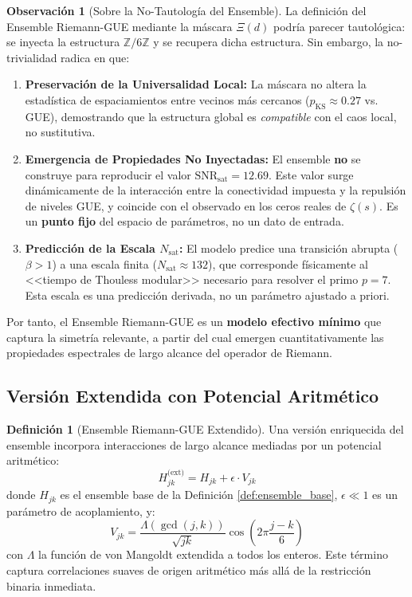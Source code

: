 \documentclass[12pt, a4paper]{article}
\theoremstyle{plain}
\theoremstyle{definition}
\newtheorem{definicion}[teorema]{Definición}
\newtheorem{observacion}[teorema]{Observación}
\theoremstyle{remark}
\begin{document}
\begin{observacion}[Sobre la No-Tautología del Ensemble]
La definición del Ensemble Riemann-GUE mediante la máscara $\Xi(d)$ podría parecer tautológica: se inyecta la estructura $\mathbb{Z}/6\mathbb{Z}$ y se recupera dicha estructura. Sin embargo, la no-trivialidad radica en que:
\begin{enumerate}
    \item \textbf{Preservación de la Universalidad Local:} La máscara no altera la estadística de espaciamientos entre vecinos más cercanos ($p_{\text{KS}} \approx 0.27$ vs. GUE), demostrando que la estructura global es \textit{compatible} con el caos local, no sustitutiva.
    \item \textbf{Emergencia de Propiedades No Inyectadas:} El ensemble \textbf{no} se construye para reproducir el valor $\mathrm{SNR}_{\text{sat}} = 12.69$. Este valor surge dinámicamente de la interacción entre la conectividad impuesta y la repulsión de niveles GUE, y coincide con el observado en los ceros reales de $\zeta(s)$. Es un \textbf{punto fijo} del espacio de parámetros, no un dato de entrada.
    \item \textbf{Predicción de la Escala $N_{\text{sat}}$:} El modelo predice una transición abrupta ($\beta > 1$) a una escala finita ($N_{\text{sat}} \approx 132$), que corresponde físicamente al <<tiempo de Thouless modular>> necesario para resolver el primo $p=7$. Esta escala es una predicción derivada, no un parámetro ajustado a priori.
\end{enumerate}
Por tanto, el Ensemble Riemann-GUE es un \textbf{modelo efectivo mínimo} que captura la simetría relevante, a partir del cual emergen cuantitativamente las propiedades espectrales de largo alcance del operador de Riemann.
\end{observacion}

\subsection{Versión Extendida con Potencial Aritmético}
\label{subsec:version_extendida}

\begin{definicion}[Ensemble Riemann-GUE Extendido]
Una versión enriquecida del ensemble incorpora interacciones de largo alcance mediadas por un potencial aritmético:
\[
H_{jk}^{\text{(ext)}} = H_{jk} + \epsilon \cdot V_{jk}
\]
donde $H_{jk}$ es el ensemble base de la Definición \ref{def:ensemble_base}, $\epsilon \ll 1$ es un parámetro de acoplamiento, y:
\[
V_{jk} = \frac{\Lambda(\gcd(j,k))}{\sqrt{jk}} \cos\left(2\pi\frac{j-k}{6}\right)
\]
con $\Lambda$ la función de von Mangoldt extendida a todos los enteros. Este término captura correlaciones suaves de origen aritmético más allá de la restricción binaria inmediata.
\end{definicion}
\end{document}
